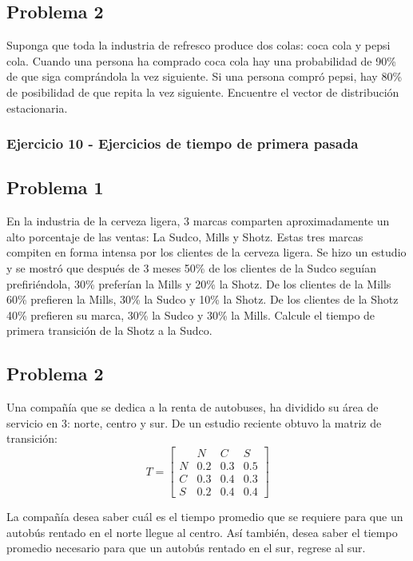 \documentclass{article}
\begin{document}
\subsection*{Problema 2}

Suponga que toda la industria de refresco produce dos colas: coca cola y pepsi cola. Cuando una persona ha comprado coca cola hay una probabilidad de 90\% de que siga comprándola la vez siguiente. Si una persona compró pepsi, hay 80\% de posibilidad de que repita la vez siguiente. Encuentre el vector de distribución estacionaria.


\subsubsection{Ejercicio 10 - Ejercicios de tiempo de primera pasada}

\subsection*{Problema 1}
En la industria de la cerveza ligera, 3 marcas comparten aproximadamente un alto porcentaje de las ventas: La Sudco, Mills y Shotz. Estas tres marcas compiten en forma intensa por los clientes de la cerveza ligera. Se hizo un estudio y se mostró que después de 3 meses 50\% de los clientes de la Sudco seguían prefiriéndola, 30\% preferían la Mills y 20\% la Shotz. De los clientes de la Mills 60\% prefieren la Mills, 30\% la Sudco y 10\% la Shotz. De los clientes de la Shotz 40\% prefieren su marca, 30\% la Sudco y 30\% la Mills. Calcule el tiempo de primera transición de la Shotz a la Sudco.

\subsection*{Problema 2}
Una compañía que se dedica a la renta de autobuses, ha dividido su área de servicio en 3: norte, centro y sur. De un estudio reciente obtuvo la matriz de transición:
\[
    T=
    \begin{bmatrix}
          & N   & C   & S   \\
        N & 0.2 & 0.3 & 0.5 \\
        C & 0.3 & 0.4 & 0.3 \\
        S & 0.2 & 0.4 & 0.4
    \end{bmatrix}
\]

La compañía desea saber cuál es el tiempo promedio que se requiere para que un autobús rentado en el norte llegue al centro. Así también, desea saber el tiempo promedio necesario para que un autobús rentado en el sur, regrese al sur.
\end{document}

